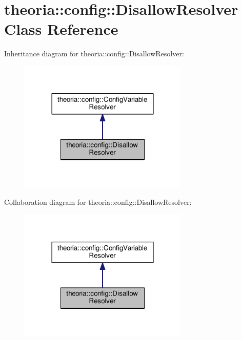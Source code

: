 \hypertarget{classtheoria_1_1config_1_1DisallowResolver}{\section{theoria\+:\+:config\+:\+:Disallow\+Resolver Class Reference}
\label{classtheoria_1_1config_1_1DisallowResolver}
}


Inheritance diagram for theoria\+:\+:config\+:\+:Disallow\+Resolver\+:
\nopagebreak
\begin{figure}[H]
\begin{center}
\leavevmode
\includegraphics[width=228pt]{classtheoria_1_1config_1_1DisallowResolver__inherit__graph}
\end{center}
\end{figure}


Collaboration diagram for theoria\+:\+:config\+:\+:Disallow\+Resolver\+:
\nopagebreak
\begin{figure}[H]
\begin{center}
\leavevmode
\includegraphics[width=228pt]{classtheoria_1_1config_1_1DisallowResolver__coll__graph}
\end{center}
\end{figure}
